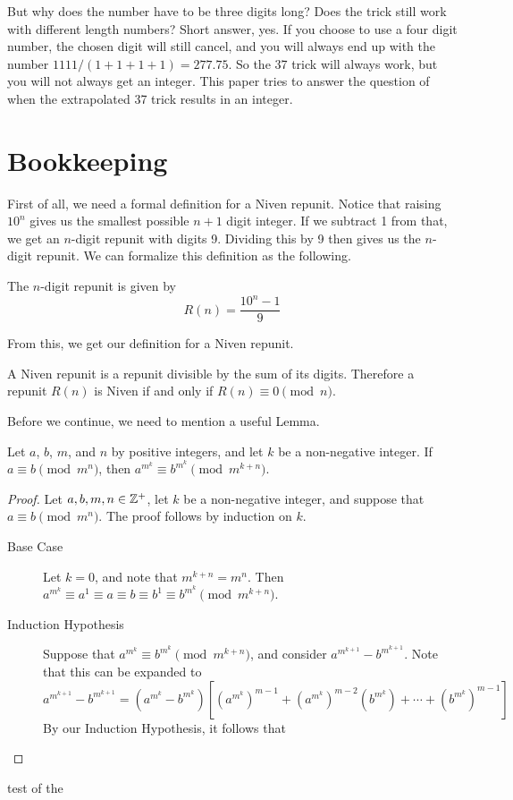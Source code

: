 \documentclass{amsart}
\begin{document}
But why does the number have to be three digits long? Does the trick still work with different length numbers? Short answer, yes. If you choose to use a four digit number, the chosen digit will still cancel, and you will always end up with the number $1111/(1+1+1+1)=277.75$. So the 37 trick will always work, but you will not always get an integer. This paper tries to answer the question of when the extrapolated 37 trick results in an integer.

\section{Bookkeeping}

First of all, we need a formal definition for a Niven repunit. Notice that raising $10^n$ gives us the smallest possible $n+1$ digit integer. If we subtract 1 from that, we get an $n$-digit repunit with digits 9. Dividing this by 9 then gives us the $n$-digit repunit. We can formalize this definition as the following.

\begin{definition}
\label{repunit}
The $n$-digit repunit is given by
\begin{equation}
\label{repuniteq}
    R(n)=\frac{10^n-1}{9}
\end{equation}
\end{definition}

From this, we get our definition for a Niven repunit.

\begin{definition}
\label{nivenrepunit}
A Niven repunit is a repunit divisible by the sum of its digits. Therefore a repunit $R(n)$ is Niven if and only if $R(n)\equiv0\pmod{n}$.
\end{definition}

Before we continue, we need to mention a useful Lemma.

\begin{lemma}
\label{useful lemma}
Let $a$, $b$, $m$, and $n$ by positive integers, and let $k$ be a non-negative integer. If $a\equiv b\pmod{m^n}$, then $a^{m^k}\equiv b^{m^k}\pmod{m^{k+n}}$.

\begin{proof}
Let $a,b,m,n\in\mathbb{Z}^+$, let $k$ be a non-negative integer, and suppose that $a\equiv b\pmod{m^n}$. The proof follows by induction on $k$.
\begin{description}
\item[Base Case] Let $k=0$, and note that $m^{k+n}=m^n$. Then $a^{m^k}\equiv a^1\equiv a\equiv b\equiv b^1\equiv b^{m^k}\pmod{m^{k+n}}$.

\vspace{5pt}

\item[Induction Hypothesis] Suppose that $a^{m^k}\equiv b^{m^k}\pmod{m^{k+n}}$, and consider $a^{m^{k+1}}-b^{m^{k+1}}$. Note that this can be expanded to \[a^{m^{k+1}}-b^{m^{k+1}}=\left(a^{m^k}-b^{m^k}\right)\left[\left(a^{m^k}\right)^{m-1}+\left(a^{m^k}\right)^{m-2}\left(b^{m^k}\right)+\cdots+\left(b^{m^k}\right)^{m-1}\right]\] By our Induction Hypothesis, it follows that 
\end{description}
\end{proof}
\end{lemma}

test of the 

\nocite{*}
\printbibliography[title=References]
\end{document}
